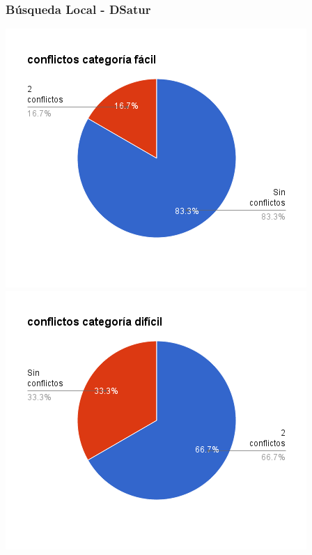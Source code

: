 \documentclass[a4paper,spanish]{article}
\begin{document}
\subsubsection{Búsqueda Local - DSatur}

\noindent
\begin{minipage}{0.50\textwidth}
	\includegraphics[width=\textwidth]{./graficos/conflictosFacil.png}
	\includegraphics[width=\textwidth]{./graficos/conflictosDificil.png}
	\label{G}
\end{minipage}
\end{document}
